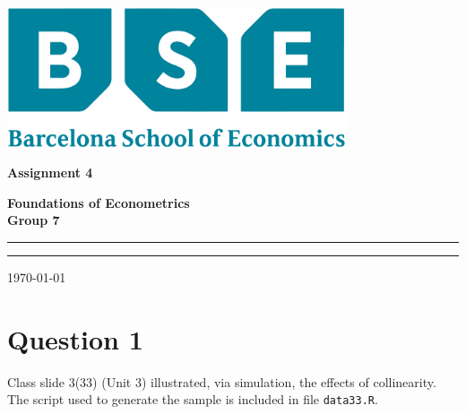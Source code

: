 \documentclass[12pt,a4paper]{article}
\begin{document}
\begin{titlepage}
\centering
\includegraphics[width=0.75\textwidth]{LaTex/imgs/bse_logo.pdf}
\par\vspace{0.75cm}
	{\huge\bfseries Assignment 4 \par}
    {\large\bfseries Foundations of Econometrics \\
                        Group 7\par}
	\vspace{0.25cm}
    \noindent\rule{\textwidth}{1pt}
    {\Large 
        \par}
    \noindent\rule{\textwidth}{1pt}
	\vfill
	{\large \today\par}
\end{titlepage}
\newpage

\section*{Question 1}
Class slide 3(33) (Unit 3) illustrated, via simulation, the effects of collinearity. The script used to generate the sample is included in file \texttt{data33.R}.
\end{document}
